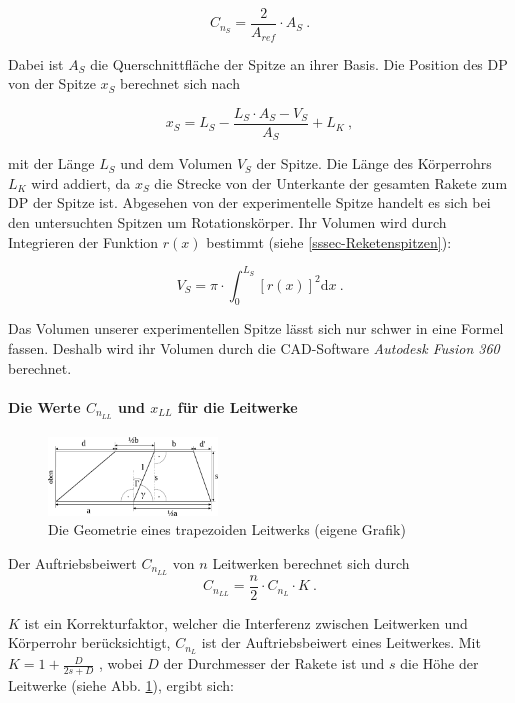\documentclass[10pt,a4paper]{article}
\begin{document}
\begin{equation}
C_{n_{S}} = \frac{2}{A_{ref}} \cdot A_{S} \ .
\label{equ-Cn_S}
\end{equation}

\noindent
Dabei ist $A_{S}$ die Querschnittfläche der Spitze an ihrer Basis. Die Position des DP von der Spitze $x_{S}$ berechnet sich nach

\begin{equation}
x_{S} = L_{S} - \frac{L_{S} \cdot A_{S} - V_{S}}{A_{S}} + L_{K} \ ,
\end{equation}

\noindent
mit der Länge $L_{S}$ und dem Volumen $V_{S}$ der Spitze. Die Länge des Körperrohrs $L_{K}$ wird addiert, da $x_{S}$ die Strecke von der Unterkante der gesamten Rakete zum DP der Spitze ist.
Abgesehen von der experimentelle Spitze handelt es sich bei den untersuchten Spitzen um Rotationskörper. Ihr Volumen wird durch Integrieren der Funktion $r(x)$ bestimmt (siehe \ref{sssec-Reketenspitzen}):

\[ V_{S} = \pi \cdot \int_{0}^{L_{S}}[r(x)]^{2} \mathrm{d}x \ .\]

\noindent
Das Volumen unserer experimentellen Spitze lässt sich nur schwer in eine Formel fassen. Deshalb wird ihr Volumen durch die CAD-Software \emph{Autodesk Fusion 360\texttrademark} berechnet.

\paragraph{Die Werte $C_{n_{LL}}$ und $x_{LL}$ für die Leitwerke}

\begin{figure}[H]
	\centering
	\includegraphics[width=0.4\textwidth]{Bilder/Leitwerk-Geometrie.pdf}
	\caption{Die Geometrie eines trapezoiden Leitwerks (eigene Grafik)}
	\label{Leitwerk-Geometrie-Abb}
\end{figure}

Der Auftriebsbeiwert $C_{n_{LL}}$ von $n$ Leitwerken berechnet sich durch \cite{sn}
\[ C_{n_{LL}} = \frac{n}{2} \cdot C_{n_{L}} \cdot K \ .\]

\noindent
$K$ ist ein Korrekturfaktor, welcher die Interferenz zwischen Leitwerken und Körperrohr berücksichtigt, $C_{n_{L}}$ ist der Auftriebsbeiwert eines Leitwerkes.
Mit $K=1+\frac{D}{2s + D}$ \cite{AbR,sn}, wobei $D$ der Durchmesser der Rakete ist und $s$ die Höhe der Leitwerke (siehe Abb. \ref{Leitwerk-Geometrie-Abb}), ergibt sich:
\end{document}
